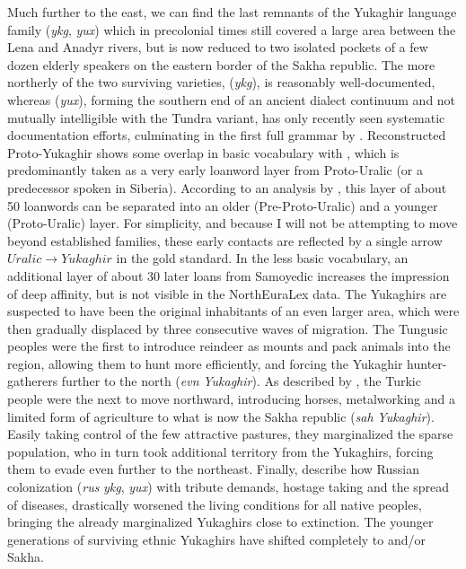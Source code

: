 Much further to the east, we can find the last remnants of the Yukaghir language family (\textit{ykg}, \textit{yux}) which in precolonial times still covered a large area between the Lena and Anadyr rivers, but is now reduced to two isolated pockets of a few dozen elderly speakers on the eastern border of the Sakha republic. The more northerly of the two surviving varieties,  (\textit{ykg}), is reasonably well-documented, whereas  (\textit{yux}), forming the southern end of an ancient dialect continuum and not mutually intelligible with the Tundra variant, has only recently seen systematic documentation efforts, culminating in the first full grammar by \cite{maslova2003}. Reconstructed Proto-Yukaghir shows some overlap in basic vocabulary with , which is predominantly taken as a very early loanword layer from Proto-Uralic (or a predecessor spoken in Siberia). According to an analysis by \cite{hakkinen2012}, this layer of
about 50 loanwords can be separated into an older (Pre-Proto-Uralic) and a younger (Proto-Uralic) layer. For simplicity, and because I will not be attempting to move beyond established families, these early contacts are reflected by a single arrow $Uralic \rightarrow Yukaghir$ in the gold standard. In the less basic vocabulary, an additional layer of about 30 later loans from Samoyedic increases the impression of deep affinity, but is not visible in the NorthEuraLex data. The Yukaghirs are suspected to have been the original inhabitants of an even larger area, which were then gradually displaced by three consecutive waves of migration. The Tungusic peoples were the first to introduce reindeer as mounts and pack animals into the region, allowing them to hunt more efficiently, and forcing the Yukaghir hunter-gatherers further to the north (\textit{evn} \arrowLA \textit{Yukaghir}). As described by \cite[p. 52]{menges1995}, the Turkic  people were the next to move northward,
introducing horses, metalworking and a limited form of agriculture to what is now the Sakha republic (\textit{sah} \arrowLA \textit{Yukaghir}). Easily taking control of the few attractive pastures, they marginalized the sparse  population, who in turn took additional territory from the Yukaghirs, forcing them to evade even further to the northeast. Finally, \cite{viires_vahtre_1993} describe how Russian colonization (\textit{rus} \arrowLA \textit{ykg}, \textit{yux}) with tribute demands, hostage taking and the spread of diseases, drastically worsened the living conditions for all native peoples, bringing the already marginalized Yukaghirs close to extinction. The younger generations of surviving ethnic Yukaghirs have shifted completely to  and/or Sakha.

